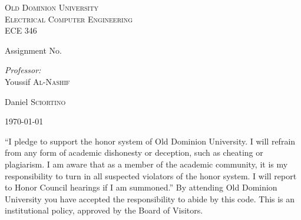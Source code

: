 \documentclass[12pt]{report}
\begin{document}
\begin{titlepage}

\newcommand{\HRule}{\rule{\linewidth}{0.5mm}} %

\center %
 
\Huge\textsc{ Old Dominion University}\\[1.cm] 
\textsc{\Large Electrical Computer Engineering}\\[.2cm]  
\textsc{\Large ECE 346}\\[.5cm] 

\vspace{.5cm}
\large\begin{center}
Assignment No.
\end{center}

\vspace{.3cm}
\begin{center}
\emph{Professor:}\large \\
Youssif \textsc{Al-Nashif}
\end{center} \large

\begin{center}
Daniel \textsc{Sciortino }
\end{center} \large
\vspace{1cm}
{\large \today}\\[2cm] %

\vspace{1cm}
\small\begin{center}
“I pledge to support the honor system of Old Dominion University. I will refrain from any form of academic dishonesty or deception, such as cheating or plagiarism. I am aware that as a member of the academic community, it is my responsibility to turn in all suspected violators of the honor system. I will report to Honor Council hearings if I am summoned.” By attending Old Dominion University you have accepted the responsibility to abide by this code. This is an institutional policy, approved by the Board of Visitors.
\end{center}

 

\vfill %

\end{titlepage}
\pagebreak 
\end{document}
